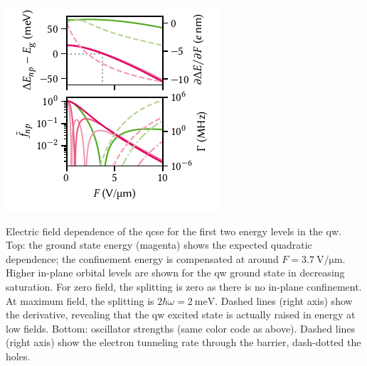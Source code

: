 \begin{marginfigure}
    \centering
    \includegraphics{img/pdf/experiment/qcse_field_dependence}
    \caption[]{
        Electric field dependence of the \gls{qcse} for the first two energy levels in the \gls{qw}.
        Top: the ground state energy (magenta) shows the expected quadratic dependence; the confinement energy is compensated at around $F=\qty{3.7}{\volt\per\micro\meter}$.
        Higher in-plane orbital levels are shown for the \gls{qw} ground state in decreasing saturation.
        For zero field, the splitting is zero as there is no in-plane confinement.
        At maximum field, the splitting is $2\hbar\omega = \qty{2}{\milli\electronvolt}$.
        Dashed lines (right axis) show the derivative, revealing that the \gls{qw} excited state is actually raised in energy at low fields.
        Bottom: oscillator strengths (same color code as above).
        Dashed lines (right axis) show the electron tunneling rate through the barrier, dash-dotted the holes.
    }
    \label{fig:exp:theory:qcse:field}
\end{marginfigure}

